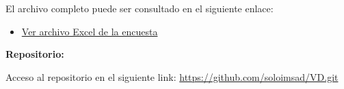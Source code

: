 \documentclass[12pt, a4paper]{article}
\begin{document}
El archivo completo puede ser consultado en el siguiente enlace:

\begin{itemize}
    \item \href{https://docs.google.com/spreadsheets/d/1KRdGL7pflDiA8TAT_pvPSt6OpXGPv6h4NTGceC8xDS0/edit?resourcekey=&gid=168064728#gid=168064728}{Ver archivo Excel de la encuesta}
\end{itemize}


\textbf{Repositorio:}  
\label{anexo:repositorio}

Acceso al repositorio en el siguiente link: 
\url{https://github.com/soloimsad/VD.git}
\end{document}
